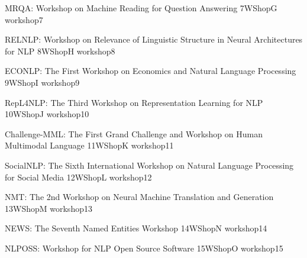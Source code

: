 \begin{wsschedule}
  {MRQA: Workshop on Machine Reading for Question Answering}
  {7}{WShopG}
  {workshop7}
  {\WShopLocG}
  
\end{wsschedule}

\begin{wsschedule}
  {RELNLP: Workshop on Relevance of Linguistic Structure in Neural 
  Architectures for NLP}
  {8}{WShopH}
  {workshop8}
  {\WShopLocH}
  
\end{wsschedule}



\begin{wsschedule}
  {ECONLP: The First Workshop on Economics and Natural Language Processing}
  {9}{WShopI}
  {workshop9}
  {\WShopLocI}
  
\end{wsschedule}

\begin{wsschedule}
  {RepL4NLP: The Third Workshop on Representation Learning for NLP}
  {10}{WShopJ}
  {workshop10}
  {\WShopLocJ}
  
\end{wsschedule}

\begin{wsschedule}
  {Challenge-MML: The First Grand Challenge and Workshop on Human Multimodal Language}
  {11}{WShopK}
  {workshop11}
  {\WShopLocK}
  
\end{wsschedule}

\begin{wsschedule}
  {SocialNLP: The Sixth International Workshop on Natural Language 
  Processing for Social Media}
  {12}{WShopL}
  {workshop12}
  {\WShopLocL}
  
\end{wsschedule}

\begin{wsschedule}
  {NMT: The 2nd Workshop on Neural Machine Translation and Generation}
  {13}{WShopM}
  {workshop13}
  {\WShopLocM}
  
\end{wsschedule}

\begin{wsschedule}
  {NEWS: The Seventh Named Entities Workshop}
  {14}{WShopN}
  {workshop14}
  {\WShopLocN}
  
\end{wsschedule}

\begin{wsschedule}
  {NLPOSS: Workshop for NLP Open Source Software}
  {15}{WShopO}
  {workshop15}
  {\WShopLocO}
  
\end{wsschedule}


